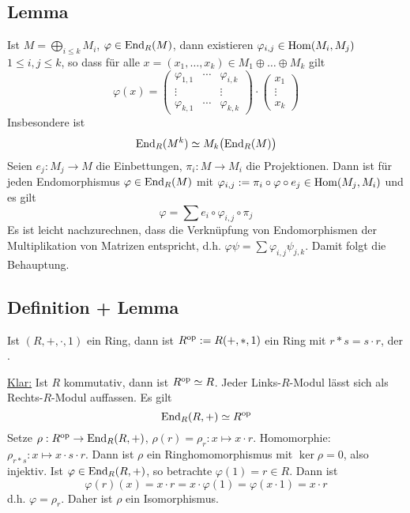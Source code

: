 \subsection[Lemma: Darstellung von $\varphi \in \End_R(M)$ als Matrix]{Lemma} %
\label{sub:227}
Ist $M = \bigoplus_{i \le k} M_i$, $\varphi \in \End_R(M)$, dann existieren $\varphi_{i,j} \in \Hom(M_i, M_j)$ $1 \le i,j \le k$, so dass für alle 
$x = (x_1, \ldots , x_k) \in M_1 \oplus \ldots \oplus M_k$ gilt
\[
	\varphi(x) = \begin{pmatrix}
		\varphi_{1,1} & \cdots & \varphi_{i,k} \\
		\vdots & &\vdots \\
		\varphi_{k,1} & \cdots & \varphi_{k,k}
	\end{pmatrix}\cdot 
	\begin{pmatrix}
		x_1 \\ \vdots \\ x_k
	\end{pmatrix}
\]
Insbesondere ist 
\[
	\End_R(M^k) \simeq M_k \enbrace[\big]{\End_R(M)}
\]
Seien $e_j : M_j \to M$ die Einbettungen, $\pi_i : M \to M_i$ die Projektionen. Dann ist für jeden Endomorphismus $\varphi \in \End_R(M)$ mit $\varphi_{i,j} := \pi_i \circ \varphi \circ e_j \in \Hom(M_j, M_i)$ und es gilt
\[
	\varphi = \sum e_i \circ \varphi_{i,j} \circ \pi_j
\]
Es ist leicht nachzurechnen, dass die Verknüpfung von Endomorphismen der Multiplikation von Matrizen entspricht, d.h. $\varphi \psi = \sum \varphi_{i,j} \psi_{j,k}$. Damit
folgt die Behauptung. \bewende

\subsection[Definition: Entgegengesetzter Ring $R^{\op}$]{Definition + Lemma} %
\label{sub:228}
Ist $(R,+,\cdot ,1)$ ein Ring, dann ist $R^{\op} := R(+, *, 1)$ ein Ring mit $r * s = s \cdot r$, der .

\uline{Klar:} Ist $R$ kommutativ, dann ist $R^{\op} \simeq R$. Jeder Links-$R$-Modul lässt sich als Rechts-$R$-Modul auffassen.
Es gilt
\[
	\End_R(R,+) \simeq R^\op
\]
Setze $\rho : R^\op \to \End_R(R,+)$, $\rho(r)= \rho_r : x \mapsto x \cdot r$. Homomorphie: $\rho_{r * s} : x \mapsto x \cdot s \cdot r$. Dann ist $\rho$ ein
Ringhomomorphismus mit $\ker \rho = 0$, also injektiv. Ist $\varphi \in \End_R(R,+)$, so betrachte $\varphi(1)= r \in R$. Dann ist 
\[
	\varphi(r)(x) = x \cdot r = x \cdot \varphi(1) = \varphi(x \cdot 1) = x \cdot r
\]
d.h. $\varphi = \rho_r$. Daher ist $\rho$ ein Isomorphismus. \bewende

